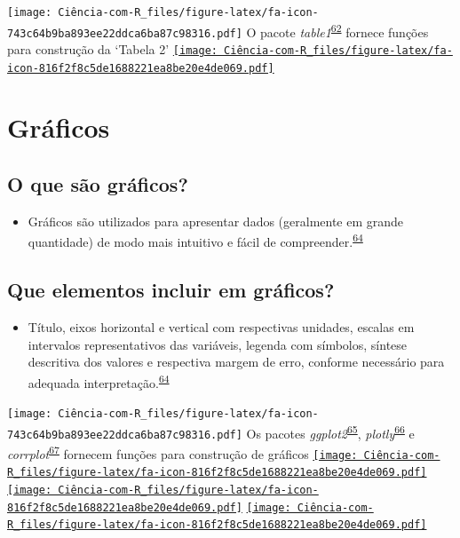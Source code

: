 \documentclass[
]{book}
\providecommand{\tightlist}{%
  \setlength{\itemsep}{0pt}\setlength{\parskip}{0pt}}
\begin{document}
\texttt{[image: Ciência-com-R\_files/figure-latex/fa-icon-743c64b9ba893ee22ddca6ba87c98316.pdf]} O pacote \emph{table1}\textsuperscript{\protect\hyperlink{ref-table1}{62}} fornece funções para construção da `Tabela 2' \href{https://cran.r-project.org/web/packages/table1/index.html}{\texttt{[image: Ciência-com-R\_files/figure-latex/fa-icon-816f2f8c5de1688221ea8be20e4de069.pdf]}}

\hypertarget{graficos}{%
\section{Gráficos}\label{graficos}}

\hypertarget{o-que-suxe3o-gruxe1ficos}{%
\subsection{O que são gráficos?}\label{o-que-suxe3o-gruxe1ficos}}

\begin{itemize}
\tightlist
\item
  Gráficos são utilizados para apresentar dados (geralmente em grande quantidade) de modo mais intuitivo e fácil de compreender.\textsuperscript{\protect\hyperlink{ref-Park2022}{64}}
\end{itemize}

\hypertarget{que-elementos-incluir-em-gruxe1ficos}{%
\subsection{Que elementos incluir em gráficos?}\label{que-elementos-incluir-em-gruxe1ficos}}

\begin{itemize}
\tightlist
\item
  Título, eixos horizontal e vertical com respectivas unidades, escalas em intervalos representativos das variáveis, legenda com símbolos, síntese descritiva dos valores e respectiva margem de erro, conforme necessário para adequada interpretação.\textsuperscript{\protect\hyperlink{ref-Park2022}{64}}
\end{itemize}

\texttt{[image: Ciência-com-R\_files/figure-latex/fa-icon-743c64b9ba893ee22ddca6ba87c98316.pdf]} Os pacotes \emph{ggplot2}\textsuperscript{\protect\hyperlink{ref-ggplot2}{65}}, \emph{plotly}\textsuperscript{\protect\hyperlink{ref-plotly}{66}} e \emph{corrplot}\textsuperscript{\protect\hyperlink{ref-corrplot}{67}} fornecem funções para construção de gráficos \href{https://cran.r-project.org/web/packages/ggplot2/index.html}{\texttt{[image: Ciência-com-R\_files/figure-latex/fa-icon-816f2f8c5de1688221ea8be20e4de069.pdf]}} \href{https://cran.r-project.org/web/packages/plotly/index.html}{\texttt{[image: Ciência-com-R\_files/figure-latex/fa-icon-816f2f8c5de1688221ea8be20e4de069.pdf]}} \href{https://cran.r-project.org/web/packages/corrplot/index.html}{\texttt{[image: Ciência-com-R\_files/figure-latex/fa-icon-816f2f8c5de1688221ea8be20e4de069.pdf]}}
\end{document}
